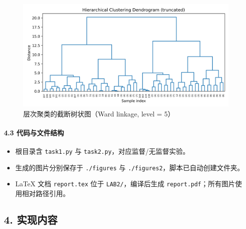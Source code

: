 \documentclass[UTF8]{ctexart}
\begin{document}
\begin{figure}[htbp]
    \centering
    \includegraphics[width=\linewidth]{figures2/dendrogram.png}
    \caption{层次聚类的截断树状图（Ward linkage, level = 5）}
    \label{fig:dendrogram}
\end{figure}

\paragraph{4.3 代码与文件结构}
\begin{itemize}
    \item 根目录含 \texttt{task1.py} 与 \texttt{task2.py}，对应监督/无监督实验。
    \item 生成的图片分别保存于 \texttt{./figures} 与 \texttt{./figures2}，脚本已自动创建文件夹。
    \item LaTeX 文档 \texttt{report.tex} 位于 \texttt{LAB2/}，编译后生成 \texttt{report.pdf}；所有图片使用相对路径引用。
\end{itemize}


\subsection*{4. 实现内容}
\end{document}
